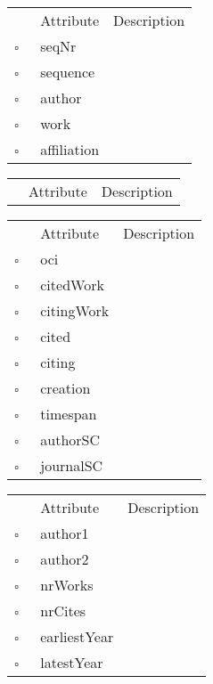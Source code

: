 \begin{table}
\caption{Authorship  }

\begin{longtable}{llp{8cm}}
& Attribute & Description \\
$\square$\ & seqNr &  \\
$\square$\ & sequence &  \\
$\square$\ & author &  \\
$\square$\ & work &  \\
$\square$\ & affiliation &  \\
\end{longtable}
\label{attr:Authorship}
\end{table}

\begin{table}
\caption{Book  }

\begin{longtable}{llp{8cm}}
& Attribute & Description \\
\end{longtable}
\label{attr:Book}
\end{table}

\clearpage
\begin{table}
\caption{Citation  }

\begin{longtable}{llp{8cm}}
& Attribute & Description \\
$\square$\ & oci &  \\
$\square$\ & citedWork &  \\
$\square$\ & citingWork &  \\
$\square$\ & cited &  \\
$\square$\ & citing &  \\
$\square$\ & creation &  \\
$\square$\ & timespan &  \\
$\square$\ & authorSC &  \\
$\square$\ & journalSC &  \\
\end{longtable}
\label{attr:Citation}
\end{table}

\begin{table}
\caption{Coauthor  }

\begin{longtable}{llp{8cm}}
& Attribute & Description \\
$\square$\ & author1 &  \\
$\square$\ & author2 &  \\
$\square$\ & nrWorks &  \\
$\square$\ & nrCites &  \\
$\square$\ & earliestYear &  \\
$\square$\ & latestYear &  \\
\end{longtable}
\label{attr:Coauthor}
\end{table}

